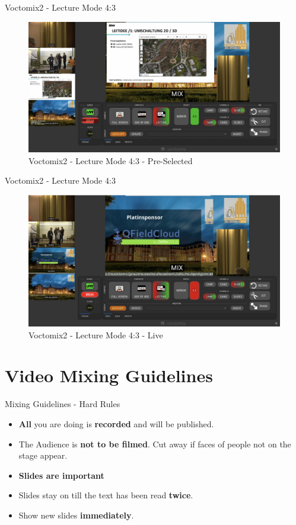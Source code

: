 \begin{frame}{Voctomix2 - Lecture Mode 4:3}
	\begin{figure}
		\centering
		\includegraphics[width=.9\textwidth]{images/voctomix2-lecture_43_select.jpg}
		\caption{Voctomix2 - Lecture Mode 4:3 - Pre-Selected}
	\end{figure}
\end{frame}

\begin{frame}{Voctomix2 - Lecture Mode 4:3}
	\begin{figure}
		\centering
		\includegraphics[width=.9\textwidth]{images/voctomix2-lecture_43.jpg}
		\caption{Voctomix2 - Lecture Mode 4:3 - Live}
	\end{figure}
\end{frame}

\section{Video Mixing Guidelines}
\begin{frame}{Mixing Guidelines - Hard Rules}
	\begin{itemize}
		\item \textbf{All} you are doing is \textbf{recorded} and will be published.
		\item The Audience is \textbf{not to be filmed}. Cut away if faces of people not on the stage appear.
		\item \textbf{Slides are important}
		\item Slides stay on till the text has been read \textbf{twice}.
		\item Show new slides \textbf{immediately}.
	\end{itemize}
\end{frame}

